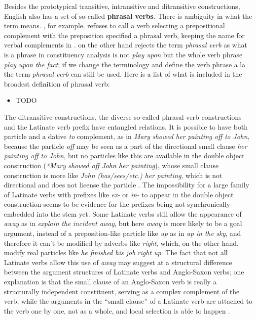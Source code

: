\documentclass[UTF8, a4paper, oneside, scheme=plain, 12pt]{ctexbook}
\newcommand*{\citepage}[1]{p.~{#1}}
\newcommand*{\concept}[1]{\textbf{#1}}
\newcommand*{\term}[1]{\emph{#1}}
\newcommand{\form}[1]{\emph{#1}}
\begin{document}
Besides the prototypical transitive, intransitive and ditransitive constructions,
English also has a set of so-called \concept{phrasal verbs}.
There is ambiguity in what the term means.
\citet[\citepage{289}]{dixon2005semantic}, for example,
refuses to call a verb selecting a prepositional complement with the preposition specified
a phrasal verb,
keeping the name for verbal complements in \citet{cgel}.
\citet{cgel} on the other hand rejects the term \term{phrasal verb} 
as what is a phrase in constituency analysis is not \form{play upon} 
but the whole verb phrase \form{play upon the fact};
if we change the terminology and define the verb phrase a la 
\citet[\citepage{41}]{dixon2005semantic}
the term \term{phrasal verb} can still be used.
Here is a list of what is included in the broadest definition of phrasal verb:
\begin{itemize}
    \item TODO
\end{itemize}

The ditransitive constructions, 
the diverse so-called phrasal verb constructions 
and the Latinate verb prefix
have entangled relations.
It is possible to have both particle and a dative \form{to} complement, 
as in \form{Mary showed her painting off to John}, 
because the particle \form{off} may be seen as a part 
of the directional small clause \form{her painting off to John}, 
but no particles like this are available in the double object construction
(\form{*Mary showed off John her painting}),
whose small clause construction is more like \form{John (has/sees/etc.) her painting},
which is not directional and does not license the particle \citep{harley2007bipartite}.
The impossibility for a large family of Latinate verbs 
with prefixes like \form{ex-} or \form{in-}
to appear in the double object construction 
seems to be evidence for the prefixes being not synchronically embedded into the stem yet.
Some Latinate verbs still allow the appearance of \form{away} 
as in \form{explain the incident away}, 
but here \form{away} is more likely to be a goal argument, 
instead of a preposition-like particle like \form{up} as in \form{up in the sky}, 
and therefore it can't be modified by adverbs like \form{right},
which, on the other hand, modify real particles like \form{he finished his job right up}.
The fact that not all Latinate verbs allow this use of \form{away} 
may suggest at a structural difference between the argument structures 
of Latinate verbs and Anglo-Saxon verbs;
one explanation is that the small clause of an Anglo-Saxon verb 
is really a structurally independent constituent, 
serving as a complex complement of the verb, 
while the arguments in the ``small clause'' of a Latinate verb 
are attached to the verb one by one, not as a whole, 
and local selection is able to happen \citep{punske2013three}.
\end{document}
